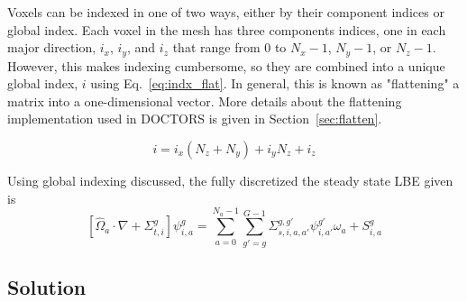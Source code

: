 Voxels can be indexed in one of two ways, either by their component indices or global index. Each voxel in the mesh has three components indices, one in each major direction, $i_x$, $i_y$, and $i_z$ that range from 0 to $N_x - 1$, $N_y - 1$, or $N_z-1$. However, this makes indexing cumbersome, so they are combined into a unique global index, $i$ using Eq.~\ref{eq:indx_flat}. In general, this is known as "flattening" a matrix into a one-dimensional vector. More details about the flattening implementation used in DOCTORS is given in Section~\ref{sec:flatten}.

\begin{equation} \label{eq:indx_flat}
i = i_x (N_z + N_y) + i_y N_z + i_z
\end{equation}

Using global indexing discussed, the fully discretized the steady state LBE given is
\begin{equation} \label{eq:boltz_i}
\left[ \hat{\Omega}_a \cdot \nabla + \Sigma_{t,i}^g \right]
\psi_{i,a}^{g} = 
\sum_{a=0}^{N_a-1} \sum_{g'=g}^{G-1} \Sigma_{s, i, a, a'}^{g, g'} \psi_{i, a'}^{g'} \omega_a + S_{i,a}^g
\end{equation}

\subsection{Solution}


